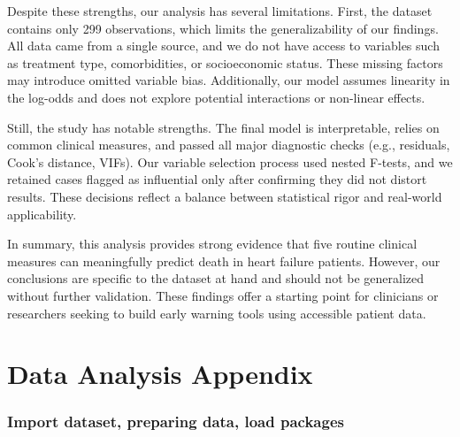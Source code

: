 \documentclass[
  letterpaper,
  DIV=11,
  numbers=noendperiod]{scrartcl}
\begin{document}
Despite these strengths, our analysis has several limitations. First,
the dataset contains only 299 observations, which limits the
generalizability of our findings. All data came from a single source,
and we do not have access to variables such as treatment type,
comorbidities, or socioeconomic status. These missing factors may
introduce omitted variable bias. Additionally, our model assumes
linearity in the log-odds and does not explore potential interactions or
non-linear effects.

Still, the study has notable strengths. The final model is
interpretable, relies on common clinical measures, and passed all major
diagnostic checks (e.g., residuals, Cook's distance, VIFs). Our variable
selection process used nested F-tests, and we retained cases flagged as
influential only after confirming they did not distort results. These
decisions reflect a balance between statistical rigor and real-world
applicability.

In summary, this analysis provides strong evidence that five routine
clinical measures can meaningfully predict death in heart failure
patients. However, our conclusions are specific to the dataset at hand
and should not be generalized without further validation. These findings
offer a starting point for clinicians or researchers seeking to build
early warning tools using accessible patient data.

\hypertarget{data-analysis-appendix}{%
\section{Data Analysis Appendix}\label{data-analysis-appendix}}

\hypertarget{import-dataset-preparing-data-load-packages}{%
\subsubsection{Import dataset, preparing data, load
packages}\label{import-dataset-preparing-data-load-packages}}
\end{document}

